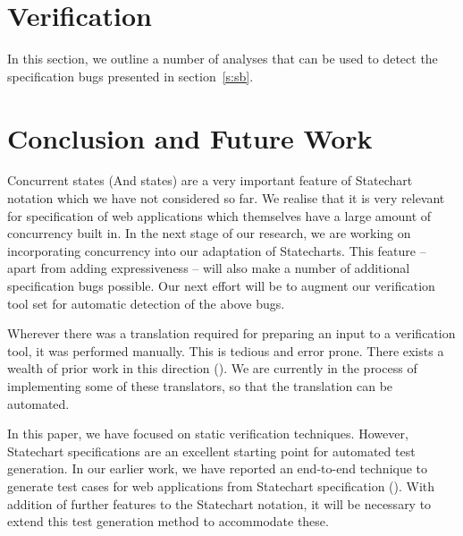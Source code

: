 \documentclass[12pt,a4paper]{article}
\begin{document}
\section{Verification} \label{s:ver}
In this section, we outline a number of analyses that can be used to detect the specification bugs presented in section~\ref{s:sb}.

\section{Conclusion and Future Work}


Concurrent states (And states) are a very important feature of Statechart notation which we have not considered so far. We realise that it is very relevant for specification of web applications which themselves have a large amount of concurrency built in. In the next stage of our research, we are working on incorporating concurrency into our adaptation of Statecharts. This feature -- apart from adding expressiveness -- will also make a number of additional specification bugs possible. Our next effort will be to augment our verification tool set for automatic detection of the above bugs.

Wherever there was a translation required for preparing an input to a verification tool, it was performed manually. This is tedious and error prone. There exists a wealth of prior work in this direction (). We are currently in the process of implementing some of these translators, so that the translation can be automated.

In this paper, we have focused on static verification techniques. However, Statechart specifications are an excellent starting point for automated test generation. In our earlier work, we have reported an end-to-end technique to generate test cases for web applications from Statechart specification (). With addition of further features to the Statechart notation, it will be necessary to extend this test generation method to accommodate these.
\end{document}
